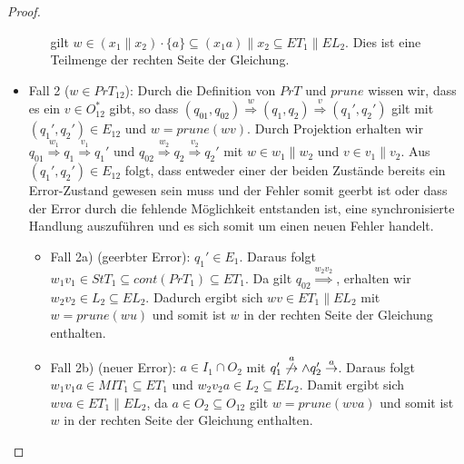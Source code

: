 \begin{proof}
\begin{itemize}
\begin{itemize}
      gilt $w\in (x_1\| x_2)\cdot\{a\}\subseteq (x_1a)\|x_2\subseteq ET_1\|EL_2$.
      Dies ist eine Teilmenge der rechten Seite der Gleichung.
  \end{itemize}
    \item Fall 2 ($w\in PrT_{12}$): Durch die Definition von $PrT$ und $prune$
      wissen wir, dass es ein $v\in O_{12}^*$ gibt, so dass $(q_{01},q_{02})
      \overset{w}{\Rightarrow} (q_1,q_2) \overset{v}{\Rightarrow} (q_1',q_2')$
      gilt mit $(q_1',q_2')\in E_{12}$ und $w=prune(wv)$. Durch Projektion
      erhalten wir $q_{01} \overset{w_1}{\Rightarrow} q_1
      \overset{v_1}{\Rightarrow} q_1'$ und $q_{02} \overset{w_2}{\Rightarrow}
      q_2 \overset{v_2}{\Rightarrow} q_2'$ mit $w\in w_1\|w_2$ und $v\in
      v_1\|v_2$. Aus $(q_1',q_2')\in E_{12}$ folgt, dass entweder einer der
      beiden Zustände bereits ein Error-Zustand gewesen sein muss und der Fehler
      somit geerbt ist oder dass der Error durch die fehlende Möglichkeit
      entstanden ist, eine synchronisierte Handlung auszuführen und es sich
      somit um einen neuen Fehler handelt.
      \begin{itemize}
        \item Fall 2a) (geerbter Error): \OBdA{} $q_1'\in E_1$. Daraus folgt
          $w_1v_1\in StT_1\subseteq cont(PrT_1)\subseteq ET_1$. Da gilt
          $q_{02}\overset{w_2v_2}{\Rightarrow}$, erhalten wir $w_2v_2\in
          L_2\subseteq EL_2$. Dadurch ergibt sich $wv\in ET_1\|EL_2$ mit
          $w=prune(wu)$ und somit ist $w$ in der rechten Seite der Gleichung
          enthalten.
        \item Fall 2b) (neuer Error): \oBdA{} $a\in I_1\cap O_2$ mit
          $q_1'\overset{a}{\not{\hspace{-0.1cm}\rightarrow}} \wedge q_2'
          \overset{a}{\rightarrow}$. Daraus folgt $w_1v_1a\in MIT_1\subseteq
          ET_1$ und $w_2v_2a\in L_2\subseteq EL_2$. Damit ergibt sich $wva\in
          ET_1\|EL_2$, da $a\in O_2\subseteq O_{12}$ gilt $w=prune(wva)$ und
          somit ist $w$ in der rechten Seite der Gleichung enthalten.
      \end{itemize}
  \end{itemize}


\end{proof}
